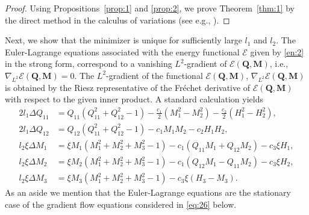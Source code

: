 \documentclass{article}
\def\Qvec{\mathbf{Q}}
\def \Mvec{\mathbf{M}}
\begin{document}
\begin{proof}
Using Propositions~\ref{prop:1} and \ref{prop:2}, we prove Theorem~\ref{thm:1} by the direct method in the calculus of variations (see e.g., \cite[Theorem 2.1]{Rindler}).
\end{proof}
Next, we show that the minimizer is unique for sufficiently large $l_1$ and $l_2$. 
The Euler-Lagrange equations associated with the energy functional $\mathcal{E}$ given by \eqref{en:2}  in the strong form, correspond to a vanishing $L^2$-gradient of $\mathcal{E}\left(\Qvec, \Mvec\right)$, i.e., $\nabla_{L^2}\mathcal{E}\left(\Qvec, \Mvec\right)=0$. The $L^2$-gradient of the functional $\mathcal{E}\left(\Qvec, \Mvec\right)$, $\nabla_{L^2}\mathcal{E}\left(\Qvec, \Mvec\right)$ is obtained by the Riesz representative of the Fr\'echet derivative of $\mathcal{E}\left(\Qvec, \Mvec\right)$ with respect to the given inner product. A standard calculation yields 
\begin{subequations}\label{EL}
\begin{align}
\label{EL:1}
2l_1\Delta Q_{11} &=  Q_{11}\left(Q_{11}^2 + Q_{12}^2 -1\right) - \frac{c_1}{2}\left(M_1^2 - M_2^2\right) - \frac{c_2}{2}\left(H_1^2 - H_2^2\right),\\
\label{EL:2}
2l_1\Delta Q_{12} &=  Q_{12}\left(Q_{11}^2 + Q_{12}^2 - 1\right) - c_1M_1M_2 - c_2H_1H_2,\\
\label{EL:3}
l_2\xi\Delta M_1 &= \xi M_1\left(M_1^2 + M_2^2 + M_3^2 - 1\right) - c_1\left(Q_{11}M_1 + Q_{12}M_2\right) - c_3\xi H_1,\\
\label{EL:4}
l_2\xi\Delta M_2 &= \xi M_2\left(M_1^2 + M_2^2 + M_3^2 - 1\right) - c_1\left(Q_{12}M_1 - Q_{11}M_2\right) - c_3\xi H_2,\\
\label{EL:5}
l_2\xi\Delta M_3 &= \xi M_3\left(M_1^2 + M_2^2 + M_3^2 - 1\right) - c_3\xi \left(H_3-M_3\right).
\end{align}
\end{subequations}
As an aside we mention that the Euler-Lagrange equations are the stationary case of the gradient flow equations considered in  \eqref{eq:26} below.
\end{document}
